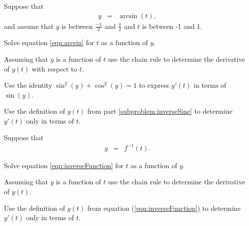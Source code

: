 \begin{problem}
\item Suppose that
  \begin{eqnarray}
    \label{eqn:arcsin}
    y &= & \arcsin(t),
  \end{eqnarray}
  and assume that $y$ is between $\frac{-\pi}{2}$ and $\frac{\pi}{2}$ and
  $t$ is between -1 and 1.
  \begin{subproblem}
  \item Solve equation \ref{eqn:arcsin} for $t$ as a function of
    $y$.
    \label{subproblem:inverseSine}
    \vfill
  \item Assuming that $y$ is a function of $t$ use the chain rule to
    determine the derivative of $y(t)$ with respect to $t$.
    \vfill
  \item Use the identity $\sin^2(y)+\cos^2(y)=1$ to express $y'(t)$ in
    terms of $\sin(y)$.
    \vfill
  \item Use the definition of $y(t)$ from part \ref{subproblem:inverseSine} to determine $y'(t)$ only in
    terms of $t$.
    \vfill

  \end{subproblem}

  \clearpage

\item Suppose that
  \begin{eqnarray}
    \label{eqn:inverseFunction}
    y &= & f^{-1}(t).
  \end{eqnarray}
  \begin{subproblem}
  \item Solve equation \ref{eqn:inverseFunction} for $t$ as a function
    of $y$.
    \label{subproblem:generalInverse}
    \vfill

  \item Assuming that $y$ is a function of $t$ use the chain rule to
    determine the derivative of $y(t)$.
    \vfill

  \item Use the definition of $y(t)$ from equation (\ref{eqn:inverseFunction}) to determine $y'(t)$ only in terms of $t$.
    \vfill

  \end{subproblem}


\end{problem}

\postClass

